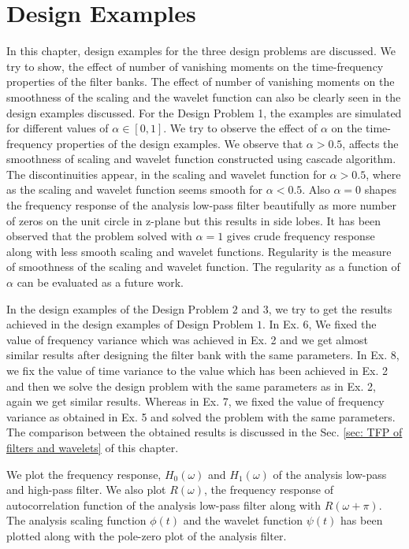 \chapter{Design Examples}
\label{Results and Discussions}
In this chapter, design examples for the three design problems are discussed. We try to show, the effect of number of vanishing moments on the time-frequency properties of the filter banks. The effect of number of vanishing moments on the smoothness of the scaling and the wavelet function can also be clearly seen in the design examples discussed. For the Design Problem 1, the examples are simulated for different values of $\alpha \in [0,1]$. We try to observe the effect of $\alpha$ on the time-frequency properties of the design examples. We observe that $\alpha > 0.5$, affects the smoothness of scaling and wavelet function constructed using cascade algorithm. The discontinuities appear, in the scaling and wavelet function for $\alpha > 0.5$, where as the scaling and wavelet function seems smooth for $\alpha <0.5$. Also $\alpha =0$ shapes the frequency response of the analysis low-pass filter beautifully as more number of zeros on the unit circle in z-plane but this results in side lobes. It has been observed that the problem solved with $\alpha=1$ gives crude frequency response along with less smooth scaling and wavelet functions. Regularity is the measure of smoothness of the scaling and wavelet function. The regularity as a function of $\alpha$ can be evaluated as a future work.  

In the design examples of the Design Problem $2$ and $3$, we try to get the results achieved in the design examples of Design Problem $1$. In {Ex. 6}, We fixed the value of frequency variance which was achieved in {Ex. 2} and we get almost similar results after designing the filter bank with the same parameters. In {Ex. 8}, we fix the value of time variance to the value which has been achieved in {Ex. 2} and then we solve the design problem with the same parameters as in {Ex. 2}, again we get similar results. Whereas in {Ex. 7}, we fixed the value of frequency variance as obtained in {Ex. 5} and solved the problem with the same parameters. The comparison between the obtained results is discussed in the Sec. \ref{sec: TFP of filters and wavelets} of this chapter.  

We plot the frequency response, $H_0(\omega)$  and $H_1(\omega)$ of the analysis low-pass and high-pass filter. We also plot $R(\omega)$, the frequency response of autocorrelation function of the analysis low-pass filter along with $R(\omega + \pi)$. The analysis scaling function $\phi(t)$ and the wavelet function $\psi(t)$ has been plotted along with the pole-zero plot of the analysis filter. 


